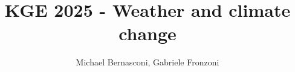 \documentclass{knowdive}
\title{KGE 2025 - Weather and climate change}
\author{Michael Bernasconi, Gabriele Fronzoni}
\begin{document}
\maketitle
\begin{sloppypar}
\large
\begin{spacing}{1.05}











\end{spacing}
\end{sloppypar}
\end{document}
